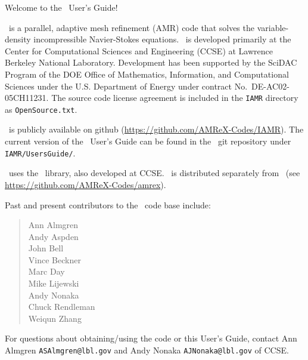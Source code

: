 Welcome to the \iamr\ User's Guide!

\iamr\ is a parallel, adaptive mesh refinement (AMR) code that solves the 
variable-density incompressible Navier-Stokes equations.  \iamr\ is developed 
primarily at the Center for Computational Sciences and
Engineering (CCSE) at Lawrence Berkeley National Laboratory.  Development has been supported
by the SciDAC Program of the DOE Office of Mathematics, Information, and Computational 
Sciences under the U.S. Department of Energy under contract No.\ DE-AC02-05CH11231.
The source code license agreement is included in the {\tt IAMR} directory as
{\tt OpenSource.txt}.

\iamr\ is publicly available on github 
(\url{https://github.com/AMReX-Codes/IAMR}).
The current version of the \iamr\ User's Guide can be found in 
the \iamr\ git repository under {\tt IAMR/UsersGuide/}.

\iamr\ uses the \amrex\ library, also developed at CCSE.
\amrex\ is distributed separately from \iamr\ 
(see \url{https://github.com/AMReX-Codes/amrex}).

Past and present contributors to the \iamr\ code base include:
\begin{quote}
Ann Almgren\\
Andy Aspden\\
John Bell\\
Vince Beckner\\
Marc Day\\
Mike Lijewski\\
Andy Nonaka\\
Chuck Rendleman\\
Weiqun Zhang\\
\end{quote}

\noindent For questions about obtaining/using the code or this 
User's Guide, contact Ann Almgren {\tt ASAlmgren@lbl.gov} and Andy Nonaka 
{\tt AJNonaka@lbl.gov} of CCSE.
